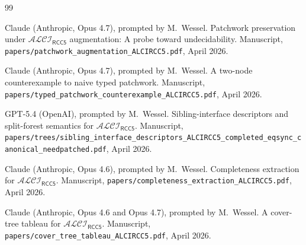 \documentclass[11pt]{article}
\theoremstyle{definition}
\theoremstyle{remark}
\newcommand{\ALCIRCC}[1]{\mathcal{ALCI}_{\mathsf{RCC#1}}}
\begin{document}
\begin{thebibliography}{99}

Claude (Anthropic, Opus 4.7), prompted by M.~Wessel.
\newblock Patchwork preservation under $\ALCIRCC{5}$ augmentation: A
  probe toward undecidability.
\newblock Manuscript, \texttt{papers/patchwork\_augmentation\_ALCIRCC5.pdf},
  April 2026.

Claude (Anthropic, Opus 4.7), prompted by M.~Wessel.
\newblock A two-node counterexample to naive typed patchwork.
\newblock Manuscript,
  \texttt{papers/typed\_patchwork\_counterexample\_ALCIRCC5.pdf},
  April 2026.

GPT-5.4 (OpenAI), prompted by M.~Wessel.
\newblock Sibling-interface descriptors and split-forest semantics for
  $\ALCIRCC{5}$.
\newblock Manuscript,
  \texttt{papers/trees/sibling\_interface\_descriptors\_ALCIRCC5\_completed\_eqsync\_canonical\_needpatched.pdf},
  April 2026.

Claude (Anthropic, Opus 4.6), prompted by M.~Wessel.
\newblock Completeness extraction for $\ALCIRCC{5}$.
\newblock Manuscript,
  \texttt{papers/completeness\_extraction\_ALCIRCC5.pdf}, April 2026.

Claude (Anthropic, Opus 4.6 and Opus 4.7), prompted by M.~Wessel.
\newblock A cover-tree tableau for $\ALCIRCC{5}$.
\newblock Manuscript,
  \texttt{papers/cover\_tree\_tableau\_ALCIRCC5.pdf}, April 2026.

\end{thebibliography}
\end{document}
